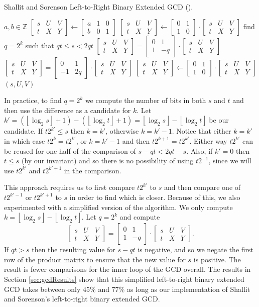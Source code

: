 \documentclass{ucalgthes1}
\theoremstyle{definition}
\newcommand{\ZZ}{\mathbb{Z}}
\newcommand{\matrixtt}[4]{\left[ \begin{array}{rr} #1 & #2 \\ #3 & #4 \end{array} \right]}
\newcommand{\matrixThreeTwo}[6]{\left[ \begin{array}{rrr} #1 & #2 & #3 \\ #4 & #5 & #6 \end{array} \right]}
\newcommand{\floor}[1]{\left\lfloor #1 \right\rfloor}
\begin{document}
\begin{algorithm}[htb]
\caption{Shallit and Sorenson Left-to-Right Binary Extended GCD (\cite{Shallit1994}).}
\label{alg:shallitGcd}
\begin{algorithmic}[1]
\Require $a,b \in \ZZ$
\State $\matrixThreeTwo{s}{U}{V}{t}{X}{Y} \gets 
        \matrixThreeTwo{a}{1}{0}{b}{0}{1}$
	\State $\matrixThreeTwo{s}{U}{V}{t}{X}{Y} \gets
	        \matrixtt{0}{1}{1}{0} \cdot \matrixThreeTwo{s}{U}{V}{t}{X}{Y}$
\EndIf
{}
	\State find $q=2^k$ such that $qt \le s < 2qt$
		\State $\matrixThreeTwo{s}{U}{V}{t}{X}{Y} =
		\matrixtt{0}{1}{1}{-q} \cdot \matrixThreeTwo{s}{U}{V}{t}{X}{Y}$
	\Else
		\State $\matrixThreeTwo{s}{U}{V}{t}{X}{Y} =
		\matrixtt{0}{1}{-1}{2q} \cdot \matrixThreeTwo{s}{U}{V}{t}{X}{Y}$
	\EndIf
		\State $\matrixThreeTwo{s}{U}{V}{t}{X}{Y} \gets
	    	    \matrixtt{0}{1}{1}{0} \cdot \matrixThreeTwo{s}{U}{V}{t}{X}{Y}$
	\EndIf
\EndWhile
\State \Return $(s, U, V)$
\end{algorithmic}
\end{algorithm}
In practice, to find $q=2^k$ we compute the number of bits in both $s$ and $t$ and then use the difference as a candidate for $k$.  Let $k' = (\floor{\log_2s} + 1) - (\floor{\log_2t}+1) = \floor{\log_2s} - \floor{\log_2t}$ be our candidate.  If $t2^{k'} \le s$ then $k = k'$, otherwise $k = k'-1$.  Notice that either $k=k'$ in which case $t2^k=t2^{k'}$, or $k=k'-1$ and then $t2^{k+1} = t2^{k'}$.  Either way $t2^{k'}$ can be reused for one half of the comparison of $s-qt < 2qt - s$.  Also, if $k' = 0$ then $t \le s$ (by our invariant) and so there is no possibility of using $t2^{-1}$, since we will use $t2^{k'}$ and $t2^{k'+1}$ in the comparison.

This approach requires us to first compare $t2^{k'}$ to $s$ and then compare one of $t2^{k'-1}$ or $t2^{k'+1}$ to $s$ in order to find which is closer.  Because of this, we also experimented with a simplified version of the algorithm.  We only compute $k = \floor{\log_2s}-\floor{\log_2t}$.  Let $q=2^k$ and compute
\[
	\matrixThreeTwo{s}{U}{V}{t}{X}{Y} =
		\matrixtt{0}{1}{1}{-q} \cdot \matrixThreeTwo{s}{U}{V}{t}{X}{Y}.
\]
If $qt > s$ then the resulting value for $s-qt$ is negative, and so we negate the first row of the product matrix to ensure that the new value for $s$ is positive.  The result is fewer comparisons for the inner loop of the GCD overall.  The results in Section \ref{sec:gcdResults} show that this simplified left-to-right binary extended GCD takes between only 45\% and 77\% as long as our implementation of Shallit and Sorenson's left-to-right binary extended GCD.
\end{document}
